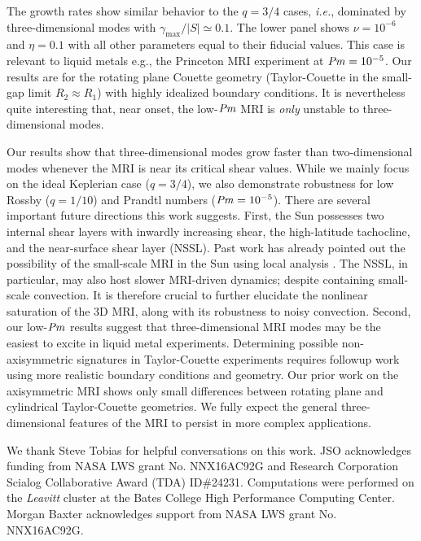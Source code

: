 \documentclass[aps,prl,reprint,superscriptaddress]{revtex4-1}
\newcommand{\Prm}{\mbox{\textit{Pm}}}
\begin{document}
The growth rates show similar behavior to the $q=3/4$ cases, \textit{i.e.}, dominated by three-dimensional modes with $\gamma_{\max}/|S|\simeq0.1$.
The lower panel shows $\nu=10^{-6}$ and $\eta=0.1$ with all other parameters equal to their fiducial values. 
This case is relevant to liquid metals e.g., the Princeton MRI experiment \citep{2002JFM...462..365G}
at $\Prm=10^{-5}$. 
Our results are for the rotating plane Couette geometry (Taylor-Couette in the small-gap limit $R_{2}\approx{R}_{1}$) with highly idealized boundary conditions.
It is nevertheless quite interesting that, near onset, the low-$\Prm$ MRI is \emph{only} unstable to three-dimensional modes.

Our results show that three-dimensional modes grow faster than two-dimensional modes whenever the MRI is near its critical shear values.
While we mainly focus on the ideal Keplerian case ($q=3/4$), we also demonstrate robustness for low Rossby ($q=1/10$) and Prandtl numbers ($\Prm=10^{-5}$).
There are several important future directions this work suggests.
First, the Sun possesses two internal shear layers with inwardly increasing shear, the high-latitude tachocline, and the near-surface shear layer (NSSL). 
Past work has already pointed out the possibility of the small-scale MRI in the Sun using local analysis \citep{2007ApJ...667L.207P,2011MNRAS.411L..26M,2014ApJ...787...21K}.
The NSSL, in particular, may also host slower MRI-driven dynamics; despite containing small-scale convection.
It is therefore crucial to further elucidate the nonlinear saturation of the 3D MRI, along with its robustness to noisy convection.
Second, our low-$\Prm$ results suggest that three-dimensional MRI modes may be the easiest to excite in liquid metal experiments.
Determining possible non-axisymmetric signatures in Taylor-Couette experiments requires followup work using more realistic boundary conditions and geometry. 
Our prior work on the axisymmetric MRI \citep{2017ApJ...841....1C,2017ApJ...841....2C} shows only small differences between rotating plane and cylindrical Taylor-Couette geometries. 
We fully expect the general three-dimensional features of the MRI to persist in more complex applications. 


\begin{acknowledgments}
We thank Steve Tobias for helpful conversations on this work.
JSO acknowledges funding from NASA LWS grant No. NNX16AC92G and Research Corporation Scialog Collaborative Award (TDA) ID\#24231. Computations were performed on the \emph{Leavitt} cluster at the Bates College High Performance Computing Center.
Morgan Baxter acknowledges support from NASA LWS grant No. NNX16AC92G.
\end{acknowledgments}


\end{document}
